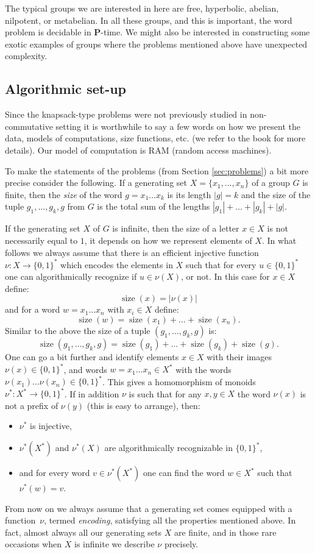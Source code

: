 \documentclass[11pt]{amsart}
\theoremstyle{definition}
\DeclareMathOperator{\size}{{size}}
\def\P{{\mathbf{P}}}
\begin{document}
The typical groups we are interested in here are free,  hyperbolic, abelian, nilpotent, or metabelian.  In all these groups, and this is important, the word problem is decidable in $\P$-time. We might also be interested in constructing some exotic examples of groups where the problems mentioned above have unexpected complexity.

\subsection{Algorithmic set-up}\label{sub:setup}
Since the knapsack-type problems were not previously studied in non-commutative setting
it is worthwhile to say a few words on how we present the data,
models of computations, size functions,  etc.
(we refer to the book \cite{MSU_book:2011} for more details).
Our model of computation is RAM (random access machines).

To make the statements of the problems (from Section \ref{sec:problems})
a bit more precise consider the following. If a  generating set $X = \{x_1,\ldots,x_n\}$ of a
group $G$  is finite, then the {\em size}
of the word $g = x_1\ldots x_k$ is its length $|g|=k$ and the size of
the tuple $g_1, \ldots, g_k, g$ from $G$
is the total sum of the lengths $|g_1| + \ldots +|g_k| +|g|$.


If the generating set $X$ of  $G$ is infinite,
then the size of a letter $x \in X$ is not necessarily equal to $1$,
it depends on how we represent elements of $X$.
In what follows we always assume that there is an efficient injective function $\nu: X \to \{0,1\}^*$ which encodes the elements in $X$
such that for every $u \in \{0,1\}^*$ one can algorithmically recognize if $u \in \nu(X)$, or not.
In this case for $x\in X$ define:
    $$\size(x) = |\nu(x)|$$
and for a word $w  = x_1 \ldots x_n$ with $x_i\in X$ define:
    $$\size(w) = \size(x_1) + \ldots + \size(x_n).$$
Similar to the above the size of a tuple $(g_1, \ldots, g_k, g)$ is:
    $$\size(g_1, \ldots, g_k, g) = \size(g_1) + \ldots + \size(g_k) +\size(g).$$
One can go a bit further and identify elements $x \in X$ with their images $\nu(x) \in \{0,1\}^*$,
and words $w  = x_1 \ldots x_n \in X^*$ with the words $\nu(x_1) \ldots \nu(x_n) \in \{0,1\}^*$.
This gives a homomorphism of monoids $\nu^*: X^* \to \{0,1\}^*$.
If in addition $\nu$ is such that for any $x,y \in X$
the word $\nu(x)$ is not a prefix of $\nu(y)$ (this is easy to arrange),
then:
\begin{itemize}
    \item
$\nu^*$ is injective,
    \item
$\nu^*(X^*)$ and $\nu^*(X)$ are algorithmically recognizable in $\{0,1\}^*$,
    \item
and for every word $v \in \nu^*(X^*)$ one can find the word $w \in X^*$ such that $\nu^*(w) = v$.
\end{itemize}
From now on we always assume that a generating set comes equipped with a function~$\nu$, termed {\it encoding},  satisfying
all the properties mentioned above.
In fact, almost  always all our generating sets $X$ are finite, and in those rare occasions when $X$ is infinite we describe $\nu$ precisely.
\end{document}
